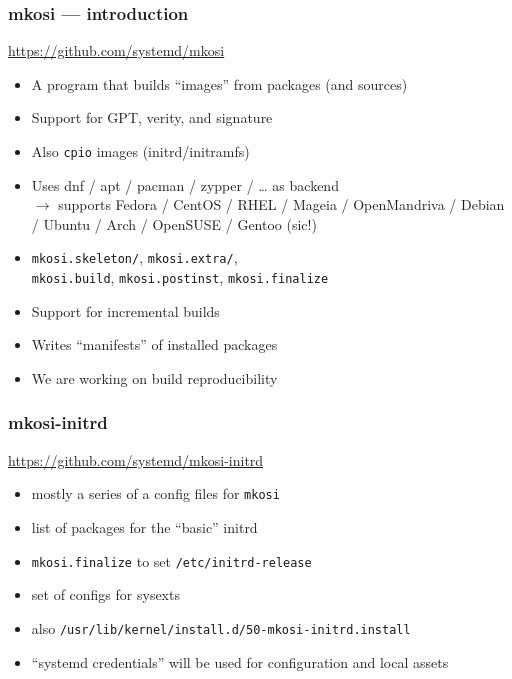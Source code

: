 \documentclass[]{beamer}
\newcommand\pp\pause
\begin{document}
\begin{frame}[fragile]
  \frametitle{mkosi — introduction}

  \url{https://github.com/systemd/mkosi}

  \pp

  \begin{itemize}
  \item A program that builds ``images'' from packages (and sources)
    \pp
  \item Support for GPT, verity, and signature
    \pp
  \item Also \texttt{cpio} images (initrd/initramfs)
    \pp
  \item Uses dnf / apt / pacman / zypper / … as backend\\
    \pp
    $\longrightarrow{}$ supports Fedora / CentOS / RHEL / Mageia / OpenMandriva / Debian / Ubuntu / Arch / OpenSUSE / Gentoo (sic!)
    \pp
  \item \texttt{mkosi.skeleton/}, \texttt{mkosi.extra/}, \\
        \texttt{mkosi.build}, \texttt{mkosi.postinst}, \texttt{mkosi.finalize}
    \pp
  \item Support for incremental builds
    \pp
  \item Writes ``manifests'' of installed packages
  \item We are working on build reproducibility
  \end{itemize}
\end{frame}

\begin{frame}[fragile]
  \frametitle{mkosi-initrd}

  \url{https://github.com/systemd/mkosi-initrd}

  \quad

  \pp

  \begin{itemize}
  \item mostly a series of a config files for \texttt{mkosi}
    \pp
  \item list of packages for the ``basic'' initrd
    \pp
  \item \texttt{mkosi.finalize} to set \texttt{/etc/initrd-release}
    \pp
  \item set of configs for sysexts

  \quad

    \pp
  \item also \texttt{/usr/lib/kernel/install.d/50-mkosi-initrd.install}

  \quad
    \pp
  \item ``systemd credentials'' will be used for configuration and local assets
  \end{itemize}
\end{frame}
\end{document}
